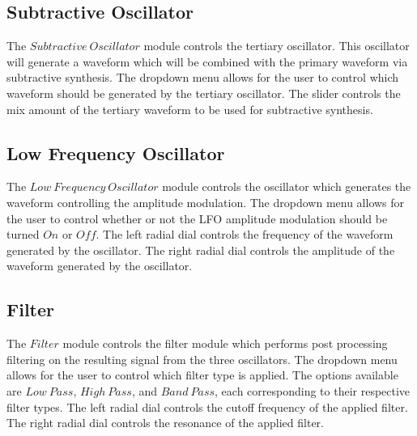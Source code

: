\documentclass[a4paper,12pt]{report}
\begin{document}

\subsection{Subtractive Oscillator}
\label{subsec:subosc}
The $Subtractive\ Oscillator$ module controls the tertiary oscillator. This oscillator will generate a waveform which will be combined with the primary waveform via subtractive synthesis. The dropdown menu allows for the user to control which waveform should be generated by the tertiary oscillator. The slider controls the mix amount of the tertiary waveform to be used for subtractive synthesis.


\subsection{Low Frequency Oscillator}
\label{subsec:lfo}
The $Low\ Frequency\ Oscillator$ module controls the oscillator which generates the waveform controlling the amplitude modulation. The dropdown menu allows for the user to control whether or not the LFO amplitude modulation should be turned $On$ or $Off$. The left radial dial controls the frequency of the waveform generated by the oscillator. The right radial dial controls the amplitude of the waveform generated by the oscillator.


\subsection{Filter}
\label{subsec:filter}
The $Filter$ module controls the filter module which performs post processing filtering on the resulting signal from the three oscillators. The dropdown menu allows for the user to control which filter type is applied. The options available are $Low\ Pass$, $High\ Pass$, and $Band\ Pass$, each corresponding to their respective filter types. The left radial dial controls the cutoff frequency of the applied filter. The right radial dial controls the resonance of the applied filter.
\end{document}
